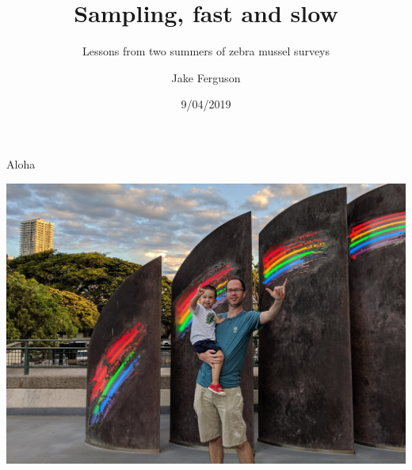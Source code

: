 \documentclass[ignorenonframetext,]{beamer}
\title{Sampling, fast and slow}
\subtitle{Lessons from two summers of zebra mussel surveys}
\author{Jake Ferguson}
\date{9/04/2019}
\begin{document}
\frame{\titlepage}

\begin{frame}

\begin{block}{Aloha}

\begin{center}\includegraphics[width=0.75\linewidth]{../Figures/Fergusons} \end{center}

\end{block}

\end{frame}
\end{document}
